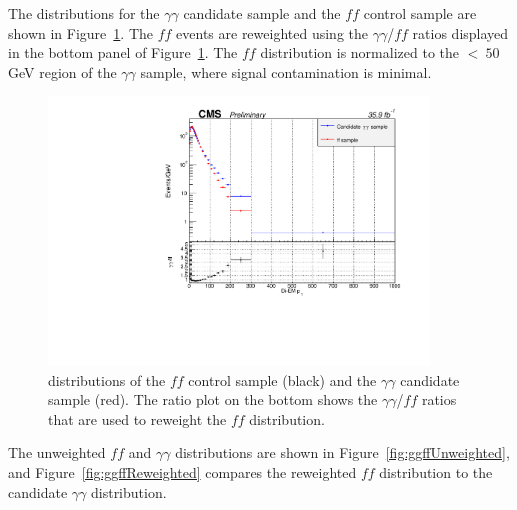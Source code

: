 The \diempt distributions for the $\gamma\gamma$ candidate sample and the $ff$ control sample are shown in Figure~\ref{fig:ggffDiempt}. The $ff$ events are reweighted using the $\gamma\gamma$/$ff$ ratios displayed in the bottom panel of Figure~\ref{fig:ggffDiempt}. The $ff$ \ETmiss distribution is normalized to the \ETmiss $<~50$ GeV region of the $\gamma\gamma$ sample, where signal contamination is minimal. 

\begin{figure}[h]
\begin{center}
\includegraphics[width=0.9\textwidth]{Figures/DataAnalysis/ggffDiempt.pdf}
\end{center}
\caption{\Diempt distributions of the $ff$ control sample (black) and the $\gamma\gamma$ candidate sample (red). The ratio plot on the bottom shows the $\gamma\gamma$/$ff$ ratios that are used to reweight the $ff$ \ETmiss distribution. }
\label{fig:ggffDiempt}
\end{figure}

The unweighted $ff$ and $\gamma\gamma$ \ETmiss distributions are shown in Figure~\ref{fig:ggffUnweighted}, and Figure~\ref{fig:ggffReweighted} compares the reweighted $ff$ \ETmiss distribution to the candidate $\gamma\gamma$ \ETmiss distribution.


